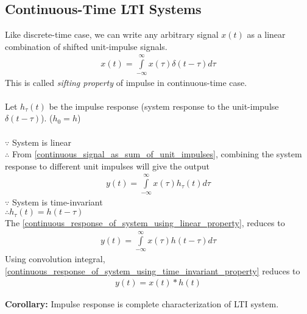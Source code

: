 \documentclass[oneside]{book}
\begin{document}
\subsection{Continuous-Time LTI Systems}
Like discrete-time case, we can write any arbitrary signal $x(t)$ as a linear combination of shifted unit-impulse signals.
\begin{align}
	x(t) = \int\limits_{-\infty}^{\infty}x(\tau)\delta(t - \tau)d\tau
	\label{continuous_signal_as_sum_of_unit_impulses}
\end{align}
This is called \textit{sifting property} of impulse in continuous-time case.
\\\\
\noindent Let $h_\tau(t)$ be the impulse response (system response to the unit-impulse $\delta(t - \tau)$). ($h_0 = h$)\\\\
\noindent\(\because\) System is linear\\
\(\therefore\) From \cref{continuous_signal_as_sum_of_unit_impulses}, combining the system response to different unit impulses will give the output
\begin{align}
	y(t) = \int\limits_{-\infty}^{\infty}x(\tau)h_\tau(t)d\tau
	\label{continuous_response_of_system_using_linear_property}
\end{align}
\noindent\(\because\) System is time-invariant\\
\(\therefore h_\tau(t) = h(t-\tau)\)\\
The \cref{continuous_response_of_system_using_linear_property}, reduces to
\begin{align}
	y(t) = \int\limits_{-\infty}^{\infty}x(\tau)h(t - \tau)d\tau
	\label{continuous_response_of_system_using_time_invariant_property}
\end{align}
Using convolution integral\cite{convolution_wiki}, \cref{continuous_response_of_system_using_time_invariant_property} reduces to
\begin{align*}
	y(t) = x(t)*h(t)
\end{align*}

\textbf{Corollary:} Impulse response is complete characterization of LTI system.
\end{document}
